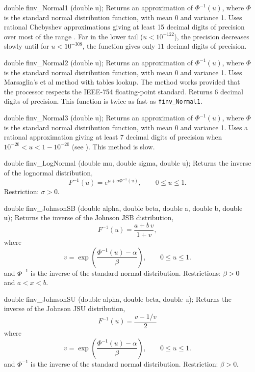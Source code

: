 double finv_Normal1 (double u);
\endcode
  \tab  
  Returns an approximation of $\Phi^{-1}(u)$, 
  where $\Phi$ is the standard normal distribution function,
  with mean 0 and variance 1. 
  Uses rational Chebyshev approximations giving at least 15 decimal 
  digits of precision over most of the range \cite{tBLA76a}. 
  Far in the lower tail ($u < 10 ^{-122}$), the precision decreases slowly 
  until for $u < 10 ^{-308}$, the function gives only 11 decimal 
  digits of precision.
 \endtab
\code


double finv_Normal2 (double u);
\endcode
  \tab  
  Returns an approximation of $\Phi^{-1}(u)$, 
  where $\Phi$ is the standard normal distribution function, with mean 0 and
  variance 1. Uses Marsaglia's et al \cite{rMAR94b} method
  with tables lookup. The method works provided that
  the processor respects the IEEE-754 floating-point standard. 
  Returns 6 decimal digits of precision. This function is twice as fast
  as {\tt finv\_Normal1}.
 \endtab
\hide\code


double finv_Normal3 (double u);
\endcode
  \tab  
  Returns an approximation of $\Phi^{-1}(u)$, 
  where $\Phi$ is the standard normal distribution function,
  with mean 0 and variance 1. 
  Uses a rational approximation giving at least 7 decimal digits of
  precision when  $10^{-20} < u < 1 - 10^{-20}$
  (see \cite{sBRA87a,tKEN80a}). This method is slow.
 \endtab
\endhide\code


double finv_LogNormal (double mu, double sigma, double u);
\endcode
  \tab
  Returns the inverse of the lognormal distribution,
$$
     F^{-1}(u) = e^{\mu + \sigma\Phi^{-1} (u)}, 
          \qquad  0 \le u \le 1.
$$
  Restriction: $\sigma > 0$.
 \endtab
\code


double finv_JohnsonSB (double alpha, double beta, double a, double b,
                       double u);
\endcode
  \tab
  Returns the inverse of the Johnson JSB distribution,
$$
     F^{-1}(u) = \frac {a + b\,v}{1 + v},
$$
 where
$$ 
     v = \exp \left({\frac{\Phi^{-1}(u) - \alpha}{\beta}}\right), 
              \qquad  0 \le u \le 1.
$$
 and $\Phi^{-1}$ is the inverse of the standard normal distribution.
 Restrictions: $\beta>0$ and $a < x < b$.
 \endtab
\code


double finv_JohnsonSU (double alpha, double beta, double u);
\endcode
  \tab
  Returns the inverse of the Johnson JSU distribution,
$$
     F^{-1}(u) = \frac {v - 1/v}{2}
$$
  where
$$
      v = \exp \left({\frac{\Phi^{-1}(u) - \alpha}{\beta}}\right), 
          \qquad  0 \le u \le 1.
$$
and $\Phi^{-1}$ is the inverse of the standard normal distribution.
Restriction: $\beta>0$.
 \endtab
\code


